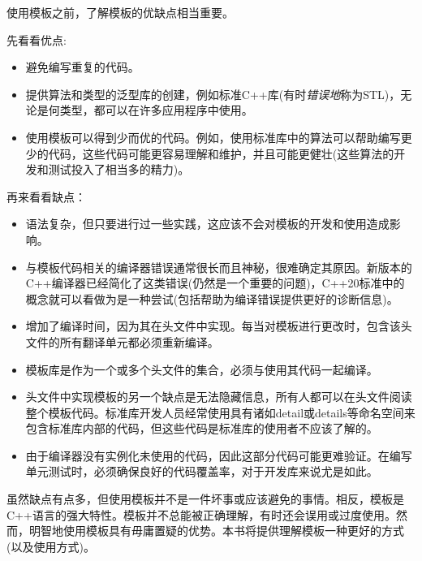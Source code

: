 
使用模板之前，了解模板的优缺点相当重要。

先看看优点:

\begin{itemize}
\item
避免编写重复的代码。

\item
提供算法和类型的泛型库的创建，例如标准C++库(有时\textit{错误地}称为STL)，无论是何类型，都可以在许多应用程序中使用。

\item
使用模板可以得到少而优的代码。例如，使用标准库中的算法可以帮助编写更少的代码，这些代码可能更容易理解和维护，并且可能更健壮(这些算法的开发和测试投入了相当多的精力)。
\end{itemize}

再来看看缺点：

\begin{itemize}
\item
语法复杂，但只要进行过一些实践，这应该不会对模板的开发和使用造成影响。

\item
与模板代码相关的编译器错误通常很长而且神秘，很难确定其原因。新版本的C++编译器已经简化了这类错误(仍然是一个重要的问题)，C++20标准中的概念就可以看做为是一种尝试(包括帮助为编译错误提供更好的诊断信息)。

\item
增加了编译时间，因为其在头文件中实现。每当对模板进行更改时，包含该头文件的所有翻译单元都必须重新编译。

\item
模板库是作为一个或多个头文件的集合，必须与使用其代码一起编译。

\item
头文件中实现模板的另一个缺点是无法隐藏信息，所有人都可以在头文件阅读整个模板代码。标准库开发人员经常使用具有诸如detail或details等命名空间来包含标准库内部的代码，但这些代码是标准库的使用者不应该了解的。

\item
由于编译器没有实例化未使用的代码，因此这部分代码可能更难验证。在编写单元测试时，必须确保良好的代码覆盖率，对于开发库来说尤是如此。
\end{itemize}

虽然缺点有点多，但使用模板并不是一件坏事或应该避免的事情。相反，模板是C++语言的强大特性。模板并不总能被正确理解，有时还会误用或过度使用。然而，明智地使用模板具有毋庸置疑的优势。本书将提供理解模板一种更好的方式(以及使用方式)。







